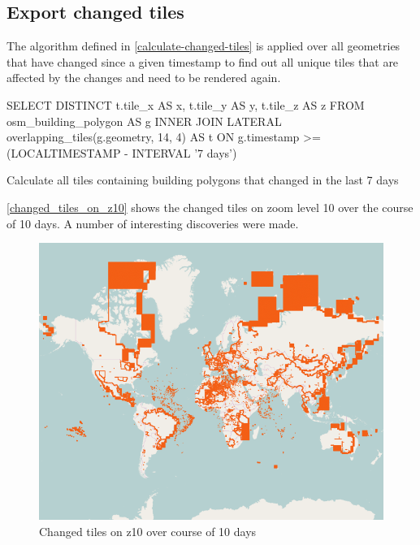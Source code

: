 \subsection*{Export changed tiles}

The algorithm defined in \autoref{calculate-changed-tiles} is applied over all geometries that have changed since a given timestamp to find out all unique tiles that are affected by the changes and need to be rendered again.

\begin{listing}[H]
  \centering
  \begin{sqlcode}
    SELECT DISTINCT t.tile_x AS x, t.tile_y AS y, t.tile_z AS z
    FROM osm_building_polygon AS g
    INNER JOIN LATERAL overlapping_tiles(g.geometry, 14, 4) AS t
    ON g.timestamp >= (LOCALTIMESTAMP - INTERVAL '7 days')
  \end{sqlcode}
  \caption{Calculate all tiles containing building polygons that changed in the last 7 days}
\end{listing}

\autoref{changed_tiles_on_z10} shows the changed tiles on zoom level 10 over the course of 10 days. A number of interesting discoveries were made.

\begin{figure}[H]
  \centering
  \includegraphics[width=1\textwidth]{images/changed_tiles_z10}
  \caption{Changed tiles on z10 over course of 10 days}
  \label{changed_tiles_on_z10}
\end{figure}

